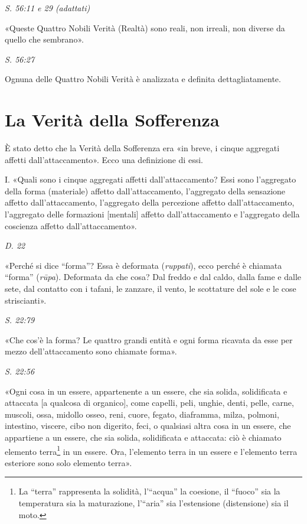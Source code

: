 \emph{S. 56:11 e 29 (adattati)}


«Queste Quattro Nobili Verità (Realtà) sono reali, non irreali, non
diverse da quello che sembrano».


\emph{S. 56:27}


 Ognuna delle Quattro Nobili Verità è analizzata e
definita dettagliatamente.


\hypertarget{x-la-verità-della-sofferenza}{\section*{La Verità della Sofferenza}}
 È stato detto che la Verità della Sofferenza era «in
breve, i cinque aggregati affetti dall’attaccamento». Ecco una
definizione di essi.


 I. «Quali sono i cinque aggregati affetti dall’attaccamento?
Essi sono l’aggregato della forma (materiale) affetto dall’attaccamento,
l’aggregato della sensazione affetto dall’attaccamento, l’aggregato
della percezione affetto dall’attaccamento, l’aggregato delle formazioni
[mentali] affetto dall’attaccamento e l’aggregato della coscienza
affetto dall’attaccamento».


\emph{D. 22}


«Perché si dice “forma”? Essa è deformata (\emph{ruppati}), ecco perché è
chiamata “forma” (\emph{rūpa}). Deformata da che cosa? Dal freddo e dal
caldo, dalla fame e dalle sete, dal contatto con i tafani, le zanzare,
il vento, le scottature del sole e le cose striscianti».


\emph{S. 22:79}


«Che cos’è la forma? Le quattro grandi entità e ogni forma ricavata da
esse per mezzo dell’attaccamento sono chiamate forma».


\emph{S. 22:56}


«Ogni cosa in un essere, appartenente a un essere, che sia solida,
solidificata e attaccata [a qualcosa di organico], come capelli, peli,
unghie, denti, pelle, carne, muscoli, ossa, midollo osseo, reni, cuore,
fegato, diaframma, milza, polmoni, intestino, viscere, cibo non
digerito, feci, o qualsiasi altra cosa in un essere, che appartiene a un
essere, che sia solida, solidificata e attaccata: ciò è chiamato
elemento terra\footnote{La “terra” rappresenta la solidità, l’“acqua” la coesione, il “fuoco” sia la temperatura sia la maturazione, l’“aria” sia l’estensione (distensione) sia il moto.} in un essere. Ora, l’elemento terra in
un essere e l’elemento terra esteriore sono solo elemento terra».


